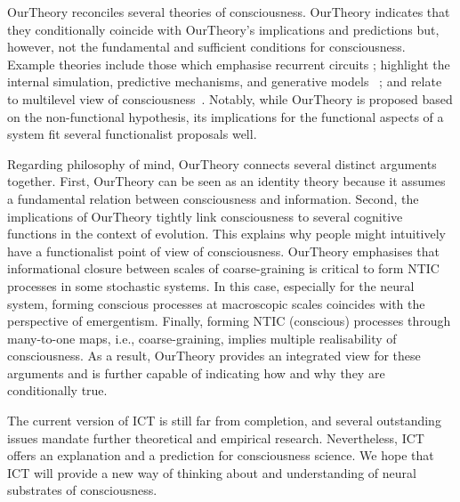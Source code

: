 \documentclass[utf8]{article}
\begin{document}
    
    \ac{OurTheory} reconciles several theories of consciousness. \ac{OurTheory} indicates that they conditionally coincide with \ac{OurTheory}'s implications and predictions but, however, not the fundamental and sufficient conditions for consciousness. Example theories include those which emphasise recurrent circuits \citep{lamme2006towards, edelman1992bright}; highlight the internal simulation,  predictive mechanisms, and generative models ~\citep{revonsuo2006inner, clark_2013,Hohwy2013, kanai_chang_yu_de_abril_biehl_guttenberg_2019, seth2014predictive, seth2015presence}; and relate to multilevel view of consciousness~\citep{pennartz2018consciousness,pennartz2015brain,prinz2007intermediate, jackendoff1987consciousness}. Notably, while \ac{OurTheory} is proposed based on the non-functional hypothesis, its implications for the functional aspects of a system fit several functionalist proposals well.
	
	
	Regarding philosophy of mind, \ac{OurTheory} connects several distinct arguments together. First, \ac{OurTheory} can be seen as an identity theory because it assumes a fundamental relation between consciousness and information. Second, the implications of \ac{OurTheory} tightly link consciousness to several cognitive functions in the context of evolution. This explains why people might intuitively have a functionalist point of view of consciousness. \ac{OurTheory} emphasises that informational closure between scales of coarse-graining is critical to form NTIC processes in some stochastic systems. In this case, especially for the neural system, forming conscious processes at macroscopic scales coincides with the perspective of emergentism. Finally, forming NTIC (conscious) processes through many-to-one maps, i.e., coarse-graining, implies multiple realisability of consciousness. As a result, \ac{OurTheory} provides an integrated view for these arguments and is further capable of indicating how and why they are conditionally true.
	
	The current version of ICT is still far from completion, and several outstanding issues mandate further theoretical and empirical research. Nevertheless, ICT offers an explanation and a prediction for consciousness science. We hope that ICT will provide a new way of thinking about and understanding of neural substrates of consciousness.  
	
\end{document}
